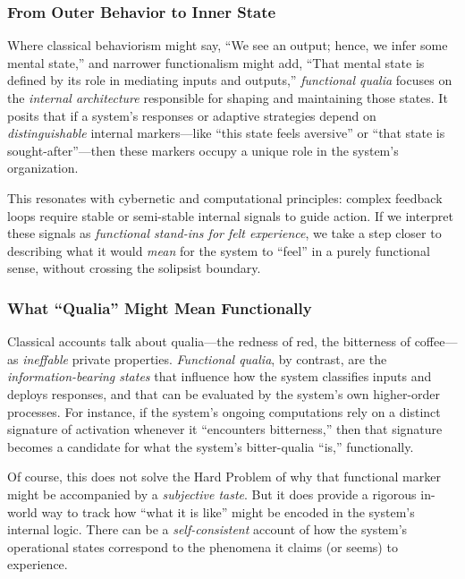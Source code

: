 \documentclass[12pt]{article}
\begin{document}
\subsubsection{From Outer Behavior to Inner State}

Where classical behaviorism might say, ``We see an output; hence, we infer some mental state,'' and narrower functionalism might add, ``That mental state is defined by its role in mediating inputs and outputs,'' \textit{functional qualia} focuses on the \textit{internal architecture} responsible for shaping and maintaining those states. It posits that if a system's responses or adaptive strategies depend on \textit{distinguishable} internal markers---like ``this state feels aversive'' or ``that state is sought-after''---then these markers occupy a unique role in the system's organization.

This resonates with cybernetic and computational principles: complex feedback loops require stable or semi-stable internal signals to guide action. If we interpret these signals as \textit{functional stand-ins for felt experience}, we take a step closer to describing what it would \textit{mean} for the system to ``feel'' in a purely functional sense, without crossing the solipsist boundary.

\subsubsection{What ``Qualia'' Might Mean Functionally}

Classical accounts talk about qualia---the redness of red, the bitterness of coffee---as \textit{ineffable} private properties. \textit{Functional qualia}, by contrast, are the \textit{information-bearing states} that influence how the system classifies inputs and deploys responses, and that can be evaluated by the system's own higher-order processes. For instance, if the system's ongoing computations rely on a distinct signature of activation whenever it ``encounters bitterness,'' then that signature becomes a candidate for what the system's bitter-qualia ``is,'' functionally.

Of course, this does not solve the Hard Problem of why that functional marker might be accompanied by a \textit{subjective taste}. But it does provide a rigorous in-world way to track how ``what it is like'' might be encoded in the system's internal logic. There can be a \textit{self-consistent} account of how the system's operational states correspond to the phenomena it claims (or seems) to experience.
\end{document}
